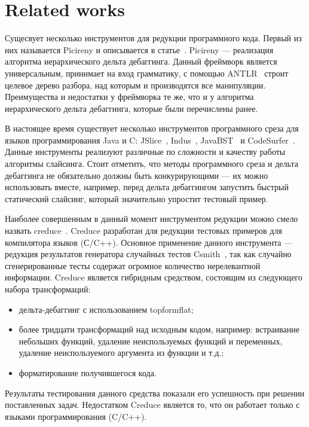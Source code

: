 \section{Related works}
Сущесвует несколько инструментов для редукции программного кода. Первый из них называется Picireny и описывается в статье~\cite{hodovan2017tree}. Picireny --- реализация алгоритма иерархического дельта дебаггинга. Данный фреймворк является универсальным, принимает на вход грамматику, с помощью ANTLR~\cite{parr2013definitive} строит целевое дерево разбора, над которым и производятся все манипуляции. Преимущества и недостатки у фреймворка те же, что и у алгоритма иерархического дельта дебаггинга, которые были перечислены ранее. 

В настоящее время существует несколько инструментов программного среза для языков программирования Java и C: JSlice~\cite{WR:04}, Indus~\cite{jayaraman2005kaveri}, JavaBST~\cite{abdallah2017javabst} и CodeSurfer~\cite{anderson2004codesurfer}. Данные инструменты реализуют различные по сложности и качеству работы алгоритмы слайсинга. Стоит отметить, что методы программного среза и дельта дебаггинга не обязательно должны быть конкурирующими --- их можно использовать вместе, например, перед дельта дебаггингом запустить быстрый статический слайсинг, который значительно упростит тестовый пример.


Наиболее совершенным в данный момент инструментом редукции можно смело назвать creduce~\cite{regehr2012test}. Creduce разработан для редукции тестовых примеров для компилятора языков (С/C++). Основное применение данного инструмента --- редукция результатов генератора случайных тестов Csmith~\cite{yang2011finding}, так как случайно сгенерированные тесты содержат огромное количество нерелевантной информации. Creduce является гибридным средством, состоящим из следующего набора трансформаций:
\begin{itemize}
	\item дельта-дебаггинг с использованием topformflat;
	\item более тридцати трансформаций над исходным кодом, например: встраивание небольших функций, удаление неиспользуемых функций и переменных, удаление неиспользуемого аргумента из функции и т.д.;
	\item форматирование получившегося кода.
\end{itemize}
Результаты тестирования данного средства показали его успешность при решении поставленных задач. Недостатком Creduce является то, что он работает только с языками программирования (C/C++).

